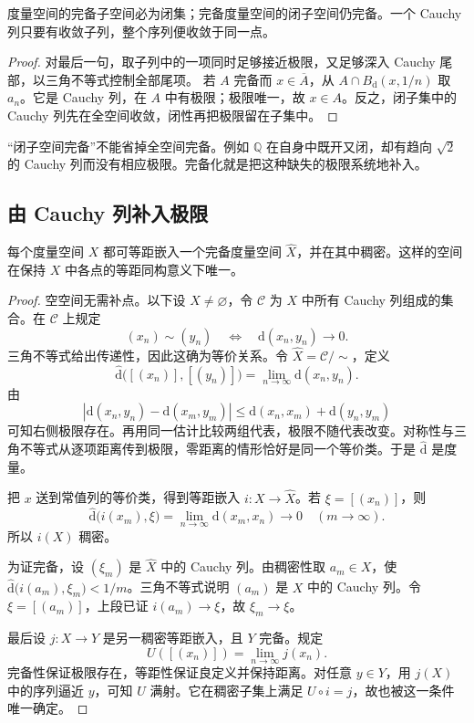 \begin{proposition}\label{b1:prop:app-complete-closed}
度量空间的完备子空间必为闭集；完备度量空间的闭子空间仍完备。一个 Cauchy 列只要有收敛子列，整个序列便收敛于同一点。
\end{proposition}
\begin{proof}
对最后一句，取子列中的一项同时足够接近极限，又足够深入 Cauchy 尾部，以三角不等式控制全部尾项。
若 \(A\) 完备而 \(x\in\overline A\)，从 \(A\cap B_{\mathrm{d}}(x,1/n)\) 取 \(a_n\)。它是 Cauchy 列，在 \(A\) 中有极限；极限唯一，故 \(x\in A\)。反之，闭子集中的 Cauchy 列先在全空间收敛，闭性再把极限留在子集中。
\end{proof}

“闭子空间完备”不能省掉全空间完备。例如 \(\mathbb Q\) 在自身中既开又闭，却有趋向 \(\sqrt2\) 的 Cauchy 列而没有相应极限。完备化就是把这种缺失的极限系统地补入。

\subsection{由 Cauchy 列补入极限}
\label{b1:subsec:A10103}

\begin{theorem}[度量空间的完备化]\label{b1:thm:app-completion}
每个度量空间 \(X\) 都可等距嵌入一个完备度量空间 \(\widehat X\)，并在其中稠密。这样的空间在保持 \(X\) 中各点的等距同构意义下唯一。
\end{theorem}
\begin{proof}
空空间无需补点。以下设 \(X\ne\varnothing\)，令 \(\mathcal C\) 为 \(X\) 中所有 Cauchy 列组成的集合。在 \(\mathcal C\) 上规定
\[
 (x_n)\sim(y_n)\quad\Longleftrightarrow\quad \mathrm{d}(x_n,y_n)\longrightarrow0.
\]
三角不等式给出传递性，因此这确为等价关系。令 \(\widehat X=\mathcal C/{\sim}\)，定义
\[
 \widehat {\mathrm{d}}\bigl([(x_n)],[(y_n)]\bigr)=\lim_{n\to\infty}\mathrm{d}(x_n,y_n).
\]
由
\[
 |\mathrm{d}(x_n,y_n)-\mathrm{d}(x_m,y_m)|
 \le \mathrm{d}(x_n,x_m)+\mathrm{d}(y_n,y_m)
\]
可知右侧极限存在。再用同一估计比较两组代表，极限不随代表改变。对称性与三角不等式从逐项距离传到极限，零距离的情形恰好是同一个等价类。于是 \(\widehat {\mathrm{d}}\) 是度量。

把 \(x\) 送到常值列的等价类，得到等距嵌入 \(i:X\rightarrow\widehat X\)。若 \(\xi=[(x_n)]\)，则
\[
 \widehat {\mathrm{d}}\bigl(i(x_m),\xi\bigr)=\lim_{n\to\infty}\mathrm{d}(x_m,x_n)
 \longrightarrow0\quad(m\to\infty).
\]
所以 \(i(X)\) 稠密。

为证完备，设 \((\xi_m)\) 是 \(\widehat X\) 中的 Cauchy 列。由稠密性取 \(a_m\in X\)，使 \(\widehat {\mathrm{d}}\bigl(i(a_m),\xi_m\bigr)<1/m\)。三角不等式说明 \((a_m)\) 是 \(X\) 中的 Cauchy 列。令 \(\xi=[(a_m)]\)，上段已证 \(i(a_m)\rightarrow\xi\)，故 \(\xi_m\rightarrow\xi\)。

最后设 \(j:X\rightarrow Y\) 是另一稠密等距嵌入，且 \(Y\) 完备。规定
\[
 U([(x_n)])=\lim_{n\to\infty}j(x_n).
\]
完备性保证极限存在，等距性保证良定义并保持距离。对任意 \(y\in Y\)，用 \(j(X)\) 中的序列逼近 \(y\)，可知 \(U\) 满射。它在稠密子集上满足 \(U\circ i=j\)，故也被这一条件唯一确定。
\end{proof}

